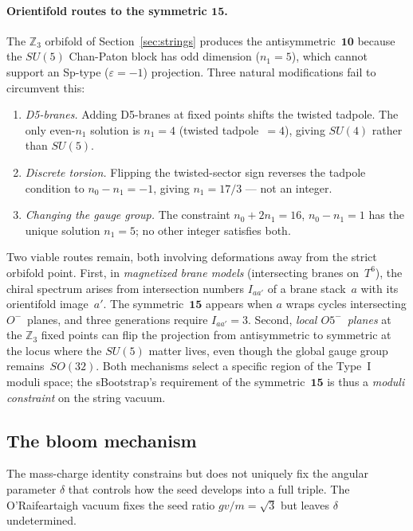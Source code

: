 \documentclass[12pt,a4paper]{article}
\begin{document}
\paragraph{Orientifold routes to the symmetric $\mathbf{15}$.}
The $\mathbb{Z}_3$ orbifold of Section~\ref{sec:strings}
produces the antisymmetric~$\mathbf{10}$ because the
$SU(5)$ Chan-Paton block has odd dimension ($n_1 = 5$),
which cannot support an Sp-type ($\varepsilon = -1$)
projection.  Three natural modifications fail to
circumvent this:
\begin{enumerate}
\item \emph{D5-branes.}  Adding D5-branes at fixed points
  shifts the twisted tadpole.  The only even-$n_1$ solution
  is $n_1 = 4$ (twisted tadpole~$=4$), giving $SU(4)$
  rather than $SU(5)$.
\item \emph{Discrete torsion.}  Flipping the twisted-sector
  sign reverses the tadpole condition to
  $n_0 - n_1 = -1$, giving $n_1 = 17/3$ --- not an integer.
\item \emph{Changing the gauge group.}  The constraint
  $n_0 + 2n_1 = 16$, $n_0 - n_1 = 1$ has the unique
  solution $n_1 = 5$; no other integer satisfies both.
\end{enumerate}
Two viable routes remain, both involving deformations away
from the strict orbifold point.  First, in \emph{magnetized
brane models} (intersecting branes on~$T^6$), the chiral
spectrum arises from intersection numbers $I_{aa'}$ of a
brane stack~$a$ with its orientifold image~$a'$.  The
symmetric~$\mathbf{15}$ appears when $a$ wraps cycles
intersecting $O^-$~planes, and three generations require
$I_{aa'} = 3$.  Second, \emph{local $O5^-$~planes} at
the $\mathbb{Z}_3$ fixed points can flip the projection
from antisymmetric to symmetric at the locus where the
$SU(5)$ matter lives, even though the global gauge group
remains~$SO(32)$.  Both mechanisms select a specific
region of the Type~I moduli space; the sBootstrap's
requirement of the symmetric~$\mathbf{15}$ is thus
a \emph{moduli constraint} on the string vacuum.

\subsection{The bloom mechanism}
\label{sec:bloom}

The mass-charge identity constrains but does not uniquely fix the
angular parameter $\delta$ that controls how the seed develops into a
full triple. The O'Raifeartaigh vacuum fixes the seed ratio
$gv/m = \sqrt{3}$ but leaves $\delta$ undetermined.
\end{document}
